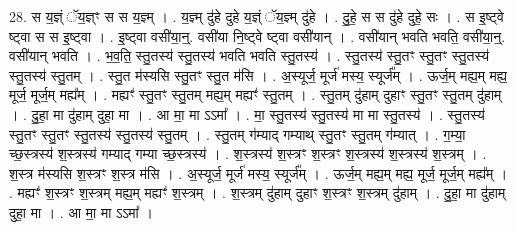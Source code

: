 \documentclass[17pt]{extarticle}
\begin{document}
28. स य॒ज्ञ्ं ॅय॒ज्ञ्ꣳ स स य॒ज्ञ्म् । . य॒ज्ञ्म् दु॑हे दुहे य॒ज्ञ्ं ॅय॒ज्ञ्म् दु॑हे । . दु॒हे॒ स स दु॑हे दुहे॒ सः । . स इ॒ष्ट्वे ष्ट्वा स स इ॒ष्ट्वा । . इ॒ष्ट्वा वसी॑या॒न्॒. वसी॑या नि॒ष्ट्वे ष्ट्वा वसी॑यान् । . वसी॑यान् भवति भवति॒ वसी॑या॒न्॒. वसी॑यान् भवति । . भ॒व॒ति॒ स्तु॒तस्य॑ स्तु॒तस्य॑ भवति भवति स्तु॒तस्य॑ । . स्तु॒तस्य॑ स्तु॒तꣳ स्तु॒तꣳ स्तु॒तस्य॑ स्तु॒तस्य॑ स्तु॒तम् । . स्तु॒त म॑स्यसि स्तु॒तꣳ स्तु॒त म॑सि । . अ॒स्यूर्ज॒ मूर्ज॑ मस्य॒ स्यूर्ज᳚म् । . ऊर्ज॒म् मह्य॒म् मह्य॒ मूर्ज॒ मूर्ज॒म् मह्य᳚म् । . मह्यꣳ॑ स्तु॒तꣳ स्तु॒तम् मह्य॒म् मह्यꣳ॑ स्तु॒तम् । . स्तु॒तम् दु॑हाम् दुहाꣳ स्तु॒तꣳ स्तु॒तम् दु॑हाम् । . दु॒हा॒ मा दु॑हाम् दुहा॒ मा । . आ मा॒ मा ऽऽमा᳚ । . मा॒ स्तु॒तस्य॑ स्तु॒तस्य॑ मा मा स्तु॒तस्य॑ । . स्तु॒तस्य॑ स्तु॒तꣳ स्तु॒तꣳ स्तु॒तस्य॑ स्तु॒तस्य॑ स्तु॒तम् । . स्तु॒तम् ग॑म्याद् गम्याथ् स्तु॒तꣳ स्तु॒तम् ग॑म्यात् । . ग॒म्या॒ च्छ॒स्त्रस्य॑ श॒स्त्रस्य॑ गम्याद् गम्या च्छ॒स्त्रस्य॑ । . श॒स्त्रस्य॑ श॒स्त्रꣳ श॒स्त्रꣳ श॒स्त्रस्य॑ श॒स्त्रस्य॑ श॒स्त्रम् । . श॒स्त्र म॑स्यसि श॒स्त्रꣳ श॒स्त्र म॑सि । . अ॒स्यूर्ज॒ मूर्ज॑ मस्य॒ स्यूर्ज᳚म् । . ऊर्ज॒म् मह्य॒म् मह्य॒ मूर्ज॒ मूर्ज॒म् मह्य᳚म् । . मह्यꣳ॑ श॒स्त्रꣳ श॒स्त्रम् मह्य॒म् मह्यꣳ॑ श॒स्त्रम् । . श॒स्त्रम् दु॑हाम् दुहाꣳ श॒स्त्रꣳ श॒स्त्रम् दु॑हाम् । . दु॒हा॒ मा दु॑हाम् दुहा॒ मा । . आ मा॒ मा ऽऽमा᳚ । \newline
\end{document}
